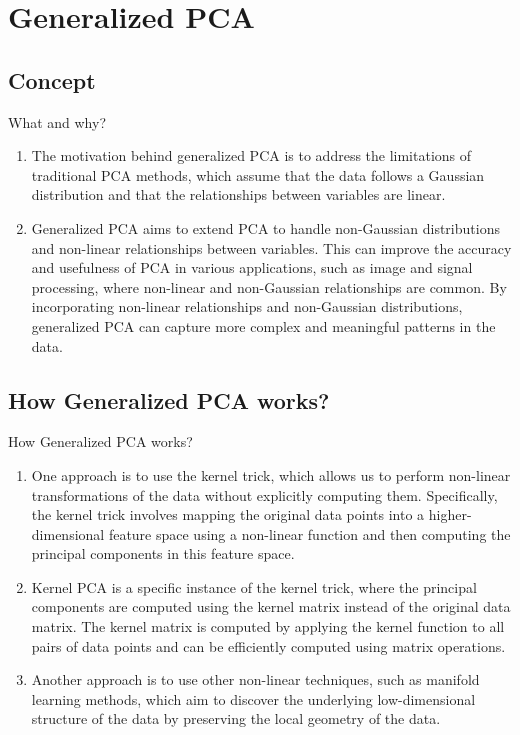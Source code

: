 \documentclass{beamer}
\begin{document}
\section{Generalized PCA}
\subsection{Concept}
\begin{frame}{What and why?}
    \begin{enumerate}
        \item The motivation behind generalized PCA is to address the limitations of traditional PCA methods, which assume that the data follows a Gaussian distribution and that the relationships between variables are linear.
        \item Generalized PCA aims to extend PCA to handle non-Gaussian distributions and non-linear relationships between variables. This can improve the accuracy and usefulness of PCA in various applications, such as image and signal processing, where non-linear and non-Gaussian relationships are common. By incorporating non-linear relationships and non-Gaussian distributions, generalized PCA can capture more complex and meaningful patterns in the data.
    \end{enumerate}
\end{frame}

\subsection{How Generalized PCA works?}
\begin{frame}{How Generalized PCA works?}
    \begin{enumerate}
        \item One approach is to use the kernel trick, which allows us to perform non-linear transformations of the data without explicitly computing them. Specifically, the kernel trick involves mapping the original data points into a higher-dimensional feature space using a non-linear function and then computing the principal components in this feature space.
        \item Kernel PCA is a specific instance of the kernel trick, where the principal components are computed using the kernel matrix instead of the original data matrix. The kernel matrix is computed by applying the kernel function to all pairs of data points and can be efficiently computed using matrix operations.
        \item Another approach is to use other non-linear techniques, such as manifold learning methods, which aim to discover the underlying low-dimensional structure of the data by preserving the local geometry of the data.
    \end{enumerate}
\end{frame}
\end{document}
